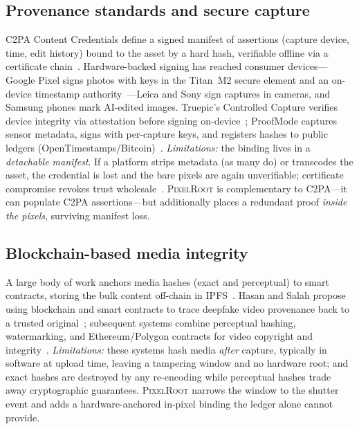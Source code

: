 \documentclass[journal]{IEEEtran}
\newcommand{\pr}{\textup{\textsc{PixelRoot}}}
\begin{document}
\subsection{Provenance standards and secure capture}
C2PA Content Credentials define a signed manifest of assertions (capture
device, time, edit history) bound to the asset by a hard hash, verifiable
offline via a certificate chain~\cite{c2pa2024spec}. Hardware-backed signing has
reached consumer devices---Google Pixel signs photos with keys in the Titan~M2
secure element and an on-device timestamp
authority~\cite{google2025c2pa}---Leica and Sony sign captures in cameras, and Samsung phones mark
AI-edited images. Truepic's Controlled Capture verifies device integrity via
attestation before signing on-device~\cite{truepic2024capture}; ProofMode
captures sensor metadata, signs with per-capture keys, and registers hashes to
public ledgers (OpenTimestamps/Bitcoin)~\cite{proofmode2023}.
\emph{Limitations:} the binding lives in a \emph{detachable manifest}. If a
platform strips metadata (as many do) or transcodes the asset, the credential
is lost and the bare pixels are again unverifiable; certificate compromise
revokes trust wholesale~\cite{c2pa2024spec}. \pr{} is complementary to
C2PA---it can populate C2PA assertions---but additionally places a redundant
proof \emph{inside the pixels}, surviving manifest loss.

\subsection{Blockchain-based media integrity}
A large body of work anchors media hashes (exact and perceptual) to smart
contracts, storing the bulk content off-chain in
IPFS~\cite{qureshi2021blockchain,benet2014ipfs}. Hasan and Salah propose using
blockchain and smart contracts to trace deepfake video provenance back to a
trusted original~\cite{hasan2019combating}; subsequent systems combine
perceptual hashing, watermarking, and Ethereum/Polygon contracts for video
copyright and
integrity~\cite{videowmblockchain2024,frontiers2025videocopyright}.
\emph{Limitations:} these systems hash media \emph{after} capture, typically in
software at upload time, leaving a tampering window and no hardware root; and
exact hashes are destroyed by any re-encoding while perceptual hashes trade away
cryptographic guarantees. \pr{} narrows the window to the shutter event and adds
a hardware-anchored in-pixel binding the ledger alone cannot provide.

\fi
\end{document}
